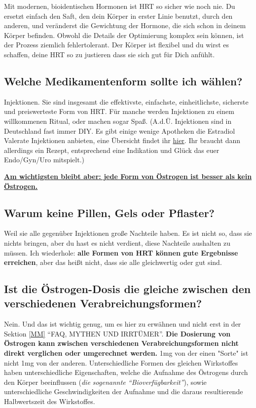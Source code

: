 \documentclass{article}
\begin{document}
Mit modernen, bioidentischen Hormonen ist HRT so sicher wie noch nie. Du ersetzt einfach den Saft, den dein Körper in erster Linie benutzt, durch den anderen, und veränderst die Gewichtung der Hormone, die sich schon in deinem Körper befinden. Obwohl die Details der Optimierung komplex sein können, ist der Prozess ziemlich fehlertolerant. Der Körper ist flexibel und du wirst es schaffen, deine HRT so zu justieren dass sie sich gut für Dich anfühlt.

\subsection{Welche Medikamentenform sollte ich wählen?}

Injektionen. Sie sind insgesamt die effektivste, einfachste, einheitlichste, sicherste und preiswerteste Form von HRT. Für manche werden Injektionen zu einem willkommenen Ritual, oder machen sogar Spaß. (A.d.Ü. Injektionen sind in Deutschland fast immer DIY. Es gibt einige wenige Apotheken die Estradiol Valerate Injektionen anbieten, eine Übersicht findet ihr \href{https://transdb.de/search?type=pharmacy&offers=eInjection}{hier}. Ihr braucht dann allerdings ein Rezept, entsprechend eine Indikation und Glück das euer Endo/Gyn/Uro mitspielt.)

\noindent\underline{\textbf{Am wichtigsten bleibt aber: jede Form von Östrogen ist besser als kein Östrogen.}}

\subsection{Warum keine Pillen, Gels oder Pflaster?}

Weil sie alle gegenüber Injektionen große Nachteile haben. Es ist nicht so, dass sie nichts bringen, aber du hast es nicht verdient, diese Nachteile aushalten zu müssen. Ich wiederhole: \textbf{alle Formen von HRT können gute Ergebnisse erreichen}, aber das heißt nicht, dass sie alle gleichwertig oder gut sind.

\subsection{Ist die Östrogen-Dosis die gleiche zwischen den verschiedenen Verabreichungsformen?}

Nein. Und das ist wichtig genug, um es hier zu erwähnen und nicht erst in der Sektion \ref{MM} “FAQ, MYTHEN UND IRRTÜMER”. \textbf{Die Dosierung von Östrogen kann zwischen verschiedenen Verabreichungsformen nicht direkt verglichen oder umgerechnet werden.} 1mg von der einen "Sorte" ist nicht 1mg von der anderen. Unterschiedliche Formen des gleichen Wirkstoffes haben unterschiedliche Eigenschaften, welche die Aufnahme des Östrogens durch den Körper beeinflussen (\textit{die sogenannte “Bioverfügbarkeit”}), sowie unterschiedliche Geschwindigkeiten der Aufnahme und die daraus resultierende Halbwertszeit des Wirkstoffes.
\end{document}
